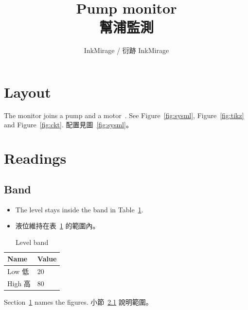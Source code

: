 \title{Pump monitor\\幫浦監測}
\author{InkMirage / 衍跡 InkMirage}
\maketitle

\section{Layout}
\label{sec:layout}

The monitor joins a pump and a motor~\cite{iec60034}. See Figure~\ref{fig:sysml}, Figure~\ref{fig:tikz} and Figure~\ref{fig:ckt}. 配置見圖~\ref{fig:sysml}。

\section{Readings}
\label{sec:readings}

\subsection{Band}
\label{sec:band}

\begin{itemize}
\item The level stays inside the band in Table~\ref{tab:band}.
\item 液位維持在表~\ref{tab:band} 的範圍內。
\end{itemize}

\begin{table}[ht]
\caption{Level band\label{tab:band}}
\centering
\begin{tabular}{ll}
\hline
Name & Value \\
\hline
Low 低 & 20 \\
High 高 & 80 \\
\hline
\end{tabular}
\end{table}

Section~\ref{sec:layout} names the figures. 小節~\ref{sec:band} 說明範圍。

